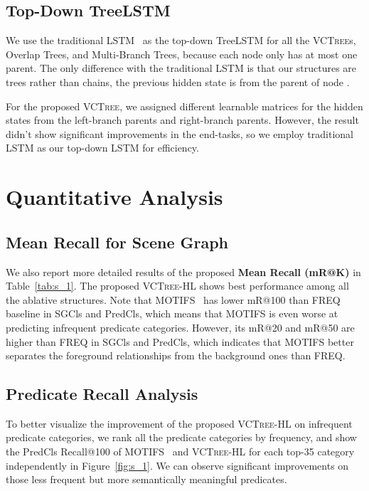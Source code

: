 \documentclass[10pt,twocolumn,letterpaper]{article}
\begin{document}
\subsection{Top-Down TreeLSTM}
We use the traditional LSTM~\cite{hochreiter1997long} as the top-down TreeLSTM for all the \textsc{VCTree}s, Overlap Trees, and Multi-Branch Trees, because each node only has at most one parent. The only difference with the traditional LSTM is that our structures are trees rather than chains, the previous hidden state is from the parent of node . 

For the proposed \textsc{VCTree}, we assigned different learnable matrices for the hidden states from the left-branch parents and right-branch parents. However, the result didn't show significant improvements in the end-tasks, so we employ traditional LSTM as our top-down LSTM for efficiency.


\section{Quantitative Analysis}
\subsection{Mean Recall for Scene Graph}
We also report more detailed results of the proposed \textbf{Mean Recall (mR@K)} in Table~\ref{tab:s_1}. The proposed \textsc{VCTree}-HL shows best performance among all the ablative structures. Note that MOTIFS~\cite{zellers2017neural} has lower mR@100 than FREQ~\cite{zellers2017neural} baseline in SGCls and PredCls, which means that MOTIFS is even worse at predicting infrequent predicate categories. However, its mR@20 and mR@50 are higher than FREQ in SGCls and PredCls, which indicates that MOTIFS better separates the foreground relationships from the background ones than FREQ. 

\subsection{Predicate Recall Analysis}
To better visualize the improvement of the proposed \textsc{VCTree}-HL on infrequent predicate categories, we rank all the predicate categories by frequency, and show the PredCls Recall@100 of MOTIFS~\cite{zellers2017neural} and \textsc{VCTree}-HL for each top-35 category independently in Figure~\ref{fig:s_1}. We can observe significant improvements on those less frequent but more semantically meaningful predicates.  
\end{document}
